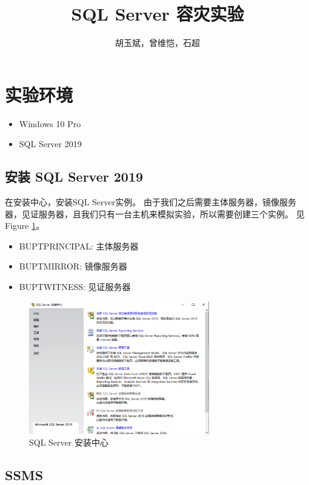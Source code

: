 \documentclass[onecolumn,oneside]{BUPTHomework}
\author{胡玉斌，曾维恺，石超}
\title{SQL Server 容灾实验}
\begin{document}
  \maketitle

  \section{实验环境}

  \begin{itemize}
    \item Windows 10 Pro
    \item SQL Server 2019
  \end{itemize}

  \subsection{安装 SQL Server 2019}

  在安装中心，安装SQL Server实例。
  由于我们之后需要主体服务器，镜像服务器，见证服务器，且我们只有一台主机来模拟实验，所以需要创建三个实例。
  见Figure \ref{pic1}。

  \begin{itemize}
    \item BUPTPRINCIPAL: 主体服务器
    \item BUPTMIRROR: 镜像服务器
    \item BUPTWITNESS: 见证服务器
  \end{itemize}

  \begin{figure}[h]
    \centering
    \includegraphics[width=0.70\textwidth]{image/pic1.png}
    \caption{SQL Server 安装中心}
    \label{pic1}
  \end{figure}

  \subsection{SSMS}
\end{document}
